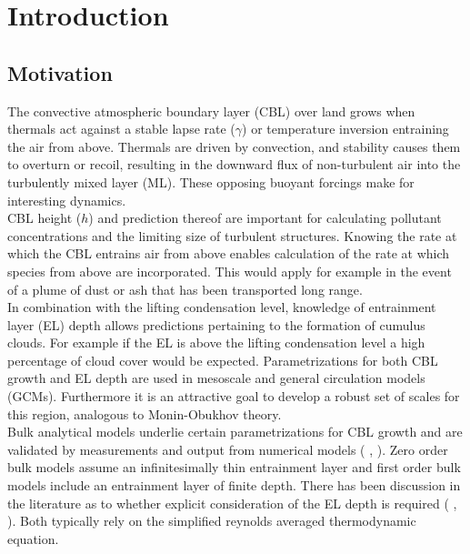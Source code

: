 
\chapter{Introduction} 
\label{ch:Introduction}
\setlength{\parindent}{0cm}

\section{Motivation}
\label{sec:}

The convective atmospheric boundary layer (\acs{CBL}) over land grows when thermals act against a stable lapse 
rate ($\gamma$) or temperature inversion entraining the air from above.  Thermals are driven by convection, and stability causes 
them to overturn or recoil, resulting in the downward flux of non-turbulent air into the turbulently mixed layer 
(\acs{ML}).  These opposing buoyant forcings make for interesting dynamics.\\

\acs{CBL} height ($h$) and prediction thereof are important for calculating pollutant concentrations
and the limiting size of turbulent structures.  Knowing the rate at which the \acs{CBL} entrains air from above
enables calculation of the rate at which species from above are incorporated. This would
apply for example in the event of a plume of dust or ash that has been transported long range.\\

In combination with the lifting condensation level, knowledge of entrainment layer (\acs{EL}) depth allows predictions pertaining
to the formation of cumulus clouds.  For example if the \acs{EL} is above the lifting condensation level a high percentage of cloud cover
would be expected.  Parametrizations for both \acs{CBL} growth and \acs{EL} depth are used in mesoscale and general circulation models
(\acs{GCM}s).  Furthermore it is an attractive goal to develop a robust set of scales for this region, analogous to Monin-Obukhov theory.\\

Bulk analytical models underlie certain parametrizations for \acs{CBL} growth and are validated by measurements 
and output from numerical models (\citeauthor{Traum11} \cite{Traum11}, \citeauthor{FedConzMir04} \cite{FedConzMir04}). 
Zero order bulk models assume an infinitesimally thin entrainment layer and first order bulk models include an entrainment layer of finite depth.
There has been discussion in the literature as to whether explicit consideration of the \acs{EL} depth is required (\citeauthor{SullMoengStev} \cite{SullMoengStev}, \citeauthor{FedConzMir04} \cite{FedConzMir04}). Both typically rely on the simplified reynolds averaged thermodynamic equation. 

